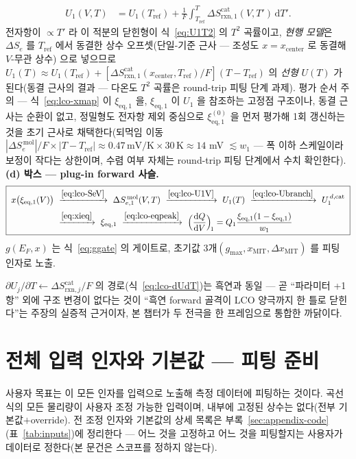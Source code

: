 \documentclass[11pt,a4paper]{article}
\newcommand{\dd}{\mathrm{d}}
\newcommand{\eq}{\mathrm{eq}}
\newcommand{\rxn}{\mathrm{rxn}}
\begin{document}
\begin{enumerate}[label=(\roman*),leftmargin=2.2em,itemsep=1pt]
\begin{equation}
\begin{aligned}
U_1(V,T)&=U_1(T_\mathrm{ref})+\frac1F\int_{T_\mathrm{ref}}^{T}\Delta S_{\rxn,1}^\mathrm{cat}(V,T')\,\dd T'.
\end{aligned}
\label{eq:lco-U1V}
\end{equation}
전자항이 $\propto T'$ 라 이 적분의 닫힌형이 식~\eqref{eq:U1T2} 의 $T^2$ 곡률이고, \emph{현행 모델}은
$\Delta S_e$ 를 $T_\mathrm{ref}$ 에서 동결한 상수 오프셋(단일-기준 근사 — 조성도 $x{=}x_\mathrm{center}$ 로
동결해 $V$-무관 상수)
으로 넣으므로 $U_1(T)\approx U_1(T_\mathrm{ref})+[\Delta S_{\rxn,1}^\mathrm{cat}(x_\mathrm{center},T_\mathrm{ref})/F]
(T-T_\mathrm{ref})$ 의 \emph{선형} $U(T)$ 가 된다(동결 근사의 결과 — 다온도 $T^2$ 곡률은 round-trip 피팅 단계 과제). 평가 순서 주의 — 식~\eqref{eq:lco-xmap} 이
$\xi_{\eq,1}$ 을, $\xi_{\eq,1}$ 이 $U_1$ 을 참조하는 고정점 구조이나, 동결 근사는 순환이 없고, 정밀형도
전자항 제외 중심으로 $\xi_{\eq,1}^{(0)}$ 을 먼저 평가해 1회 갱신하는 것을 초기 근사로 채택한다(되먹임
이동 $|\Delta S_e^{\,\mathrm{mol}}|/F\times|T-T_\mathrm{ref}|\approx0.47\,\mathrm{mV/K}\times30\,\mathrm K
\approx14$ mV $\lesssim w_1$ — 폭 이하 스케일이라 보정이 작다는 상한이며, 수렴 여부 자체는 round-trip
피팅 단계에서 수치 확인한다). \textbf{(d) 박스 — plug-in forward 사슬.}
\begin{equation}
\boxed{\;\begin{aligned}
x\big(\xi_{\eq,1}(V)\big)\ &\xrightarrow{\eqref{eq:lco-SeV}}\ \Delta S_{e,1}^{\,\mathrm{mol}}(V,T)
\ \xrightarrow{\eqref{eq:lco-U1V}}\ U_1(T)\ \xrightarrow{\eqref{eq:lco-Ubranch}}\ U_1^{\,d,\mathrm{cat}}\\[2pt]
&\xrightarrow{\eqref{eq:xieq}}\ \xi_{\eq,1}\ \xrightarrow{\eqref{eq:lco-eqpeak}}\
\Big(\frac{\dd Q}{\dd V}\Big)_{\!1}=Q_1\frac{\xi_{\eq,1}(1-\xi_{\eq,1})}{w_1}
\end{aligned}\;}
\label{eq:lco-plugin}
\end{equation}
$g(E_F,x)$ 는 식~\eqref{eq:ggate} 의 게이트로, 초기값 3개$(g_{\max},x_\mathrm{MIT},\Delta x_\mathrm{MIT})$
를 피팅 인자로 노출.
\end{enumerate}
$\partial U_j/\partial T\leftarrow\Delta S_{\rxn,j}^\mathrm{cat}/F$ 의 경로(식~\eqref{eq:lco-dUdT})는 흑연과 동일 —
곧 ``파라미터 +1 항'' 외에 구조 변경이 없다는 것이 ``흑연 forward 골격이 LCO 양극까지 한 틀로 닫힌다''는
주장의 실증적 근거이자, 본 챕터가 두 전극을 한 프레임으로 통합한 까닭이다.

\section{전체 입력 인자와 기본값 — 피팅 준비}
사용자 목표는 이 모든 인자를 입력으로 노출해 측정 데이터에 피팅하는 것이다. 곡선식의 모든 물리량이 사용자
조정 가능한 입력이며, 내부에 고정된 상수는 없다(전부 기본값$+$override). 전 조정 인자와 기본값의 상세
목록은 부록~\ref{sec:appendix-code}(표~\ref{tab:inputs})에 정리한다 — 어느 것을 고정하고 어느 것을
피팅할지는 사용자가 데이터로 정한다(본 문건은 스코프를 정하지 않는다).
\end{document}
